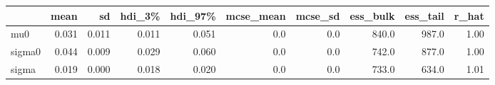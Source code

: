 \begin{tabular}{lrrrrrrrrr}
\toprule
{} &   mean &     sd &  hdi\_3\% &  hdi\_97\% &  mcse\_mean &  mcse\_sd &  ess\_bulk &  ess\_tail &  r\_hat \\
\midrule
mu0    &  0.031 &  0.011 &   0.011 &    0.051 &        0.0 &      0.0 &     840.0 &     987.0 &   1.00 \\
sigma0 &  0.044 &  0.009 &   0.029 &    0.060 &        0.0 &      0.0 &     742.0 &     877.0 &   1.00 \\
sigma  &  0.019 &  0.000 &   0.018 &    0.020 &        0.0 &      0.0 &     733.0 &     634.0 &   1.01 \\
\bottomrule
\end{tabular}

